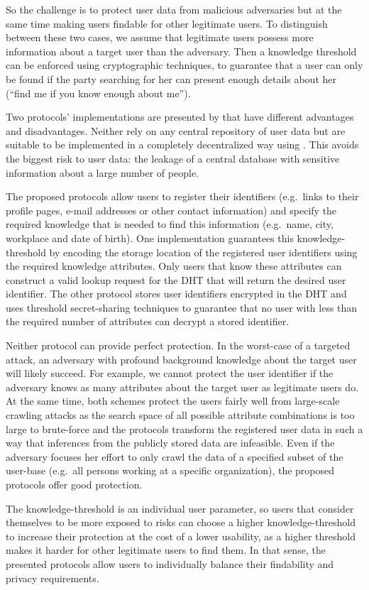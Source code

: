 So the challenge is to protect user data from malicious adversaries but
at the same time making users findable for other legitimate users.
To distinguish between these two cases, we assume that legitimate users
possess more information about a target user than the adversary.
Then a knowledge threshold can be enforced using cryptographic techniques, to
guarantee that a user can only be found if the party searching for her
can present enough details about her (\enquote{find me if you know enough about
me}).

Two protocols' implementations are presented by \citet{UserSearch} that have 
different advantages and disadvantages.
Neither rely on any central repository of user data but are suitable to be 
implemented in a completely decentralized way using .
This avoids the biggest risk to user data: the leakage of a central database 
with sensitive information about a large number of people.

The proposed protocols allow users to register their identifiers (e.g.\ 
links to their profile pages, e-mail addresses or other contact
information) and specify the required knowledge that is needed to find
this information (e.g.\  name, city, workplace and date of birth).
One implementation guarantees this knowledge-threshold by encoding the
storage location of the registered user identifiers using the required
knowledge attributes.
Only users that know these attributes can construct a valid lookup request for 
the \ac{DHT} that will return the desired user identifier.
The other protocol stores user identifiers encrypted in the \ac{DHT} and uses 
threshold secret-sharing techniques to guarantee that no user with less than 
the required number of attributes can decrypt a stored identifier.

Neither protocol can provide perfect protection.
In the worst-case of a targeted attack, an adversary with profound background 
knowledge about the target user will likely succeed.
For example, we cannot protect the user identifier if the adversary knows as 
many attributes about the target user as legitimate users do.
At the same time, both schemes protect the users fairly well from large-scale 
crawling attacks as the search space of all possible attribute combinations is 
too large to brute-force and the protocols transform the registered user data 
in such a way that inferences from the publicly stored data are infeasible.
Even if the adversary focuses her effort to only crawl the data of a specified 
subset of the user-base (e.g.\ all persons working at a specific organization), 
the proposed protocols offer good protection. 

The knowledge-threshold is an individual user parameter, so users that
consider themselves to be more exposed to risks can choose a higher
knowledge-threshold to increase their protection at the cost of a lower
usability, as a higher threshold makes it harder for other legitimate
users to find them.
In that sense, the presented protocols allow users to individually balance 
their findability and privacy requirements.

